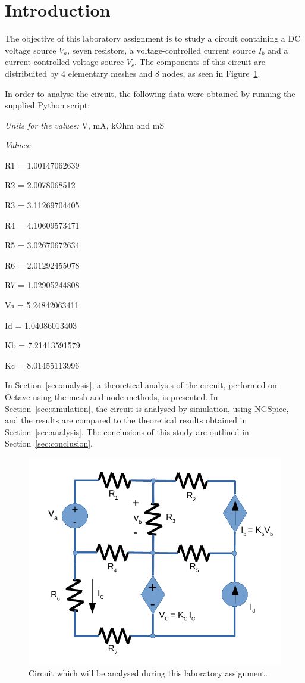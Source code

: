 \section{Introduction}
\label{sec:introduction}
The objective of this laboratory assignment is to study a circuit containing a
DC voltage source $V_a$, seven resistors, a voltage-controlled current source $I_b$ and
a current-controlled voltage source $V_c$. The components of this circuit are distribuited 
by 4 elementary meshes and 8 nodes, as seen in Figure~\ref{fig:circuit}. 

In order to analyse the circuit, the following data were obtained by running the supplied Python script: 

\textit{Units for the values:} V, mA, kOhm and mS\par
\textit{Values:} 

R1 = 1.00147062639\par
R2 = 2.0078068512\par
R3 = 3.11269704405\par
R4 = 4.10609573471\par
R5 = 3.02670672634\par
R6 = 2.01292455078\par
R7 = 1.02905244808\par
Va = 5.24842063411\par
Id = 1.04086013403\par
Kb = 7.21413591579\par
Kc = 8.01455113996


In Section~\ref{sec:analysis}, a theoretical analysis of the circuit, performed on Octave
using the mesh and node methods, is presented. In Section~\ref{sec:simulation}, the 
circuit is analysed by simulation, using NGSpice, and the results are compared to 
the theoretical results obtained in Section~\ref{sec:analysis}. The conclusions 
of this study are outlined in Section~\ref{sec:conclusion}.

\begin{figure}[H] \centering
\includegraphics[width=0.4\linewidth]{circuit.pdf}
\caption{Circuit which will be analysed during this laboratory assignment.}
\label{fig:circuit}
\end{figure}

